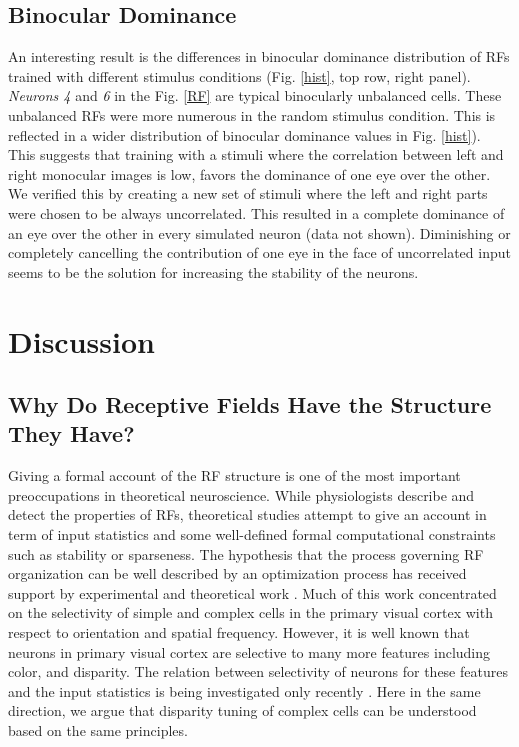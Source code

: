 {\subsection{Binocular Dominance}
	 
An interesting result is the differences in binocular dominance
distribution of RFs trained with different stimulus conditions (Fig.
\ref{hist}, top row, right panel). \textit{Neurons 4} and \textit{6} in the
Fig. \ref{RF} are typical binocularly unbalanced cells. These unbalanced
RFs were more numerous in the random stimulus condition. This is reflected
in a wider distribution of binocular dominance values in Fig.  \ref{hist}).
This suggests that training with a stimuli where the correlation between
left and right monocular images is low, favors the dominance of one eye
over the other. We verified this by creating a new set of stimuli where the
left and right parts were chosen to be always uncorrelated. This resulted
in a complete dominance of an eye over the other in every simulated neuron
(data not shown). Diminishing or completely cancelling the contribution of
one eye in the face of uncorrelated input seems to be the solution for
increasing the stability of the neurons.


\section{Discussion}
		


\subsection{Why Do Receptive Fields Have the Structure They Have?}

Giving a formal account of the RF structure is one of the most important
preoccupations in theoretical neuroscience. While physiologists describe
and detect the properties of RFs, theoretical studies attempt to give an
account in term of input statistics and some well-defined formal
computational constraints such as stability or sparseness. The hypothesis
that the process governing RF organization can be well described by an
optimization process has received support by experimental and theoretical
work \citep{ olshausen1996a,wiskott2002a, hurri2003a, kording2004a}. Much
of this work concentrated on the selectivity of simple and complex cells in
the primary visual cortex with respect to orientation and spatial
frequency.  However, it is well known that neurons in primary visual cortex
are selective to many more features including color, and disparity. The
relation between selectivity of neurons for these features and the input
statistics is being investigated only recently \citep{caywood2004a,
einhauser2003a, hoyer2000a, wyss2006a}. Here in the same direction, we
argue that disparity tuning of complex cells can be understood based on the
same principles.



}

